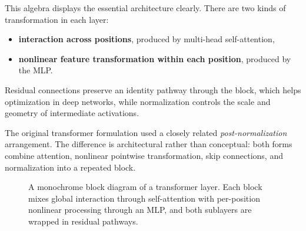 \medskip

This algebra displays the essential architecture clearly.
There are two kinds of transformation in each layer:
\begin{itemize}
    \item \textbf{interaction across positions}, produced by multi-head self-attention,
    \item \textbf{nonlinear feature transformation within each position}, produced by the MLP.
\end{itemize}
Residual connections preserve an identity pathway through the block, which helps optimization in deep networks, while normalization controls the scale and geometry of intermediate activations.

\medskip

The original transformer formulation used a closely related \emph{post-normalization} arrangement.
The difference is architectural rather than conceptual:
both forms combine attention, nonlinear pointwise transformation, skip connections, and normalization into a repeated block.

\begin{figure}[h]
\centering
{}
\caption{A monochrome block diagram of a transformer layer.
Each block mixes global interaction through self-attention with per-position nonlinear processing through an MLP, and both sublayers are wrapped in residual pathways.}
\end{figure}

